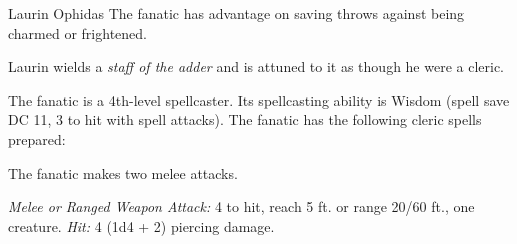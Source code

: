 \documentclass[10pt,a4paper,twoside,bg=print,twocolumn,openany,nodeprecatedcode]{dndbook}
\begin{document}
\begin{DndMonster}[float=t]{Laurin Ophidas}
\DndMonsterBasics[
armor-class = {13 (\textit{leather armor})},
hit-points = {\DndDice{6d8 + 6}},
speed = {30 ft.}
]
\DndMonsterAbilityScores[
 str = 11,
 dex = 14,
 con = 12,
 int = 10,
 wis = 13,
 cha = 14
]
\DndMonsterDetails[
skills = {Deception +4, Persuasion +4, Religion +2},
damage-immunities = {poison},
condition-immunities = {poisoned},
languages = {Any one language (usually Common)},
challenge = 2,
]
The fanatic has advantage on saving throws against being charmed or frightened.

Laurin wields a \textit{staff of the adder} and is attuned to it as though he were a cleric.

The fanatic is a 4th-level spellcaster. Its spellcasting ability is Wisdom (spell save DC 11, 3 to hit with spell attacks). The fanatic has the following cleric spells prepared:
\begin{DndMonsterSpells}
\end{DndMonsterSpells}
The fanatic makes two melee attacks.

\textsl{Melee or Ranged Weapon Attack:} 4 to hit, reach 5 ft. or range 20/60 ft., one creature. \textsl{Hit:} 4 (1d4 + 2) piercing damage.

\end{DndMonster}
\end{document}
